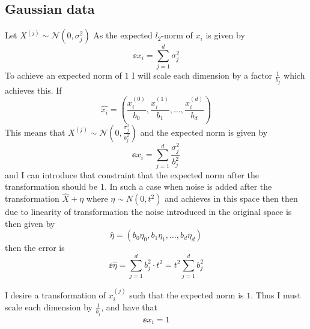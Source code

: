 \documentclass[a4paper,12pt]{article}
\begin{document}
\subsection{Gaussian data}
Let $X^{(j)} \sim \mathcal{N}(0, \sigma_j^2)$ 
As the expected $l_2$-norm of $x_i$ is given by
\[
    \ee{x_i} = \sum_{j=1}^d \sigma_j^2
\]
To achieve an expected norm of $1$ I will scale 
each dimension by a factor $\frac{1}{b_j}$ which achieves this.
If 
\[
\hat{x_i} = \left( \frac{x_i^{(0)}}{b_0}, \frac{x_i^{(1)}}{b_1}, \dots, \frac{x_i^{(d)}}{b_d} \right)
\]
This means that $X^{(j)} \sim \mathcal{N}(0,\frac{\sigma_j^2}{b_j^2})$ 
and the expected norm is given by 
\[
    \ee{x_i} = \sum_{j=1}^d \frac{\sigma_j^2}{b_j^2}
\]
and I can introduce that constraint that the expected norm
after the transformation should be $1$.
In such a case when noise is added after the transformation
$\hat{X} + \eta$
where $\eta \sim N(0, t^2)$ and achieves \edp in this space
then then due to linearity of transformation the noise 
introduced in the original space is then given by
\[
    \hat{\eta} = \left( b_0\eta_0,b_1\eta_1, \dots, b_d\eta_d \right)
\]
then the error is
\[
    \ee{\hat{\eta}} = \sum_{j=1}^d b_j^2 \cdot t^2 = t^2 \sum_{j=1}^d b_j^2
\] 





I desire a transformation of $x_i^{(j)}$ such that the 
expected norm is $1$. Thus I must scale each dimension by
$\frac{1}{b_j}$, and have that 
\[
    \ee{x_i} = 1
\]
\end{document}
